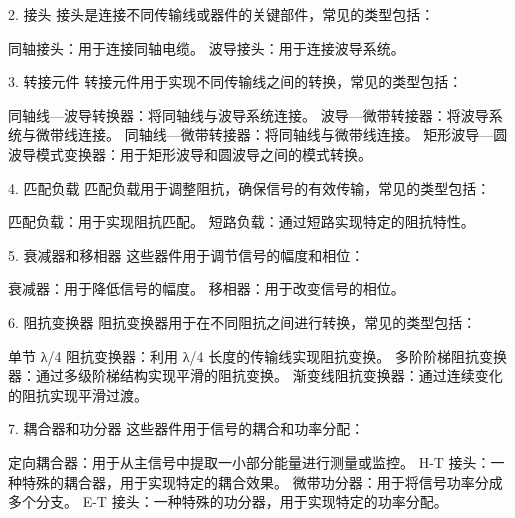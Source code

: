 2. 接头
接头是连接不同传输线或器件的关键部件，常见的类型包括：

同轴接头：用于连接同轴电缆。
波导接头：用于连接波导系统。

3. 转接元件
转接元件用于实现不同传输线之间的转换，常见的类型包括：

同轴线—波导转换器：将同轴线与波导系统连接。
波导—微带转接器：将波导系统与微带线连接。
同轴线—微带转接器：将同轴线与微带线连接。
矩形波导—圆波导模式变换器：用于矩形波导和圆波导之间的模式转换。

4. 匹配负载
匹配负载用于调整阻抗，确保信号的有效传输，常见的类型包括：

匹配负载：用于实现阻抗匹配。
短路负载：通过短路实现特定的阻抗特性。

5. 衰减器和移相器
这些器件用于调节信号的幅度和相位：

衰减器：用于降低信号的幅度。
移相器：用于改变信号的相位。

6. 阻抗变换器
阻抗变换器用于在不同阻抗之间进行转换，常见的类型包括：

单节 λ/4 阻抗变换器：利用 λ/4 长度的传输线实现阻抗变换。
多阶阶梯阻抗变换器：通过多级阶梯结构实现平滑的阻抗变换。
渐变线阻抗变换器：通过连续变化的阻抗实现平滑过渡。

7. 耦合器和功分器
这些器件用于信号的耦合和功率分配：

定向耦合器：用于从主信号中提取一小部分能量进行测量或监控。
H-T 接头：一种特殊的耦合器，用于实现特定的耦合效果。
微带功分器：用于将信号功率分成多个分支。
E-T 接头：一种特殊的功分器，用于实现特定的功率分配。